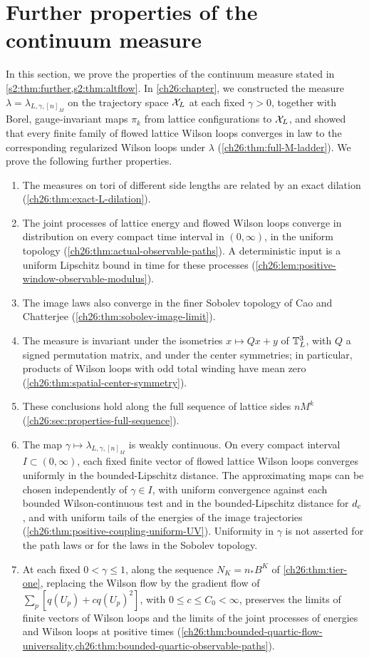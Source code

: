 \chapter{Further properties of the continuum measure}\label{ch26:chapter-properties}

In this section, we prove the properties of the continuum measure stated in \cref{s2:thm:further,s2:thm:altflow}. In \cref{ch26:chapter}, we constructed the measure $\lambda=\lambda_{L,\gamma,[n]_M}$ on the trajectory space $\mathcal X_L$ at each fixed $\gamma>0$, together with Borel, gauge-invariant maps $\pi_k$ from lattice configurations to $\mathcal X_L$, and showed that every finite family of flowed lattice Wilson loops converges in law to the corresponding regularized Wilson loops under $\lambda$ (\cref{ch26:thm:full-M-ladder}). We prove the following further properties.
\begin{enumerate}
\item The measures on tori of different side lengths are related by an exact dilation (\cref{ch26:thm:exact-L-dilation}).
\item The joint processes of lattice energy and flowed Wilson loops converge in distribution on every compact time interval in $(0,\infty)$, in the uniform topology (\cref{ch26:thm:actual-observable-paths}). A deterministic input is a uniform Lipschitz bound in time for these processes (\cref{ch26:lem:positive-window-observable-modulus}).
\item The image laws also converge in the finer Sobolev topology of Cao and Chatterjee (\cref{ch26:thm:sobolev-image-limit}).
\item The measure is invariant under the isometries $x\mapsto Qx+y$ of $\mathbb T_L^3$, with $Q$ a signed permutation matrix, and under the center symmetries; in particular, products of Wilson loops with odd total winding have mean zero (\cref{ch26:thm:spatial-center-symmetry}).
\item These conclusions hold along the full sequence of lattice sides $nM^k$ (\cref{ch26:sec:properties-full-sequence}).
\item The map $\gamma\mapsto\lambda_{L,\gamma,[n]_M}$ is weakly continuous. On every compact interval $I\subset(0,\infty)$, each fixed finite vector of flowed lattice Wilson loops converges uniformly in the bounded-Lipschitz distance. The approximating maps can be chosen independently of $\gamma\in I$, with uniform convergence against each bounded Wilson-continuous test and in the bounded-Lipschitz distance for $d_c$, and with uniform tails of the energies of the image trajectories (\cref{ch26:thm:positive-coupling-uniform-UV}). Uniformity in $\gamma$ is not asserted for the path laws or for the laws in the Sobolev topology.
\item At each fixed $0<\gamma\le1$, along the sequence $N_K=n_*B^K$ of \cref{ch26:thm:tier-one}, replacing the Wilson flow by the gradient flow of $\sum_p[q(U_p)+cq(U_p)^2]$, with $0\le c\le C_0<\infty$, preserves the limits of finite vectors of Wilson loops and the limits of the joint processes of energies and Wilson loops at positive times (\cref{ch26:thm:bounded-quartic-flow-universality,ch26:thm:bounded-quartic-observable-paths}).
\end{enumerate}

